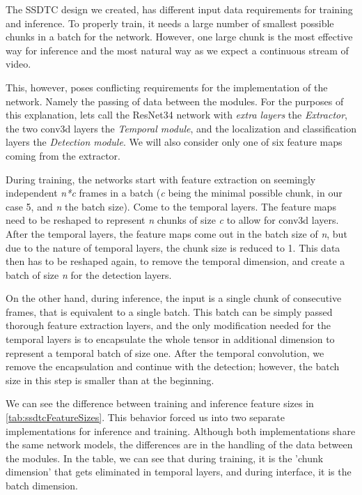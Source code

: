 
The SSDTC design we created, has different input data requirements for training and inference. To properly train, it needs a large number of smallest possible chunks in a batch for the network. However, one large chunk is the most effective way for inference and the most natural way as we expect a continuous stream of video.

This, however, poses conflicting requirements for the implementation of the network. Namely the passing of data between the modules. For the purposes of this explanation, lets call the ResNet34 network with \textit{extra layers} the \textit{Extractor}, the two conv3d layers the \textit{Temporal module}, and the localization and classification layers the \textit{Detection module}. We will also consider only one of six feature maps coming from the extractor. 

During training, the networks start with feature extraction on seemingly independent \textit{n*c} frames in a batch (\textit{c} being the minimal possible chunk, in our case 5, and \textit{n} the batch size). Come to the temporal layers. The feature maps need to be reshaped to represent \textit{n} chunks of size \textit{c} to allow for conv3d layers. After the temporal layers, the feature maps come out in the batch size of \textit{n}, but due to the nature of temporal layers, the chunk size is reduced to 1. This data then has to be reshaped again, to remove the temporal dimension, and create a batch of size \textit{n} for the detection layers.  

On the other hand, during inference, the input is a single chunk of consecutive frames, that is equivalent to a single batch. This batch can be simply passed thorough feature extraction layers, and the only modification needed for the temporal layers is to encapsulate the whole tensor in additional dimension to represent a temporal batch of size one. After the temporal convolution, we remove the encapsulation and continue with the detection; however, the batch size in this step is smaller than at the beginning. 

We can see the difference between training and inference feature sizes in \cref{tab:ssdtcFeatureSizes}. This behavior forced us into two separate implementations for inference and training. Although both implementations share the same network models, the differences are in the handling of the data between the modules. In the table, we can see that during training, it is the 'chunk dimension' that gets eliminated in temporal layers, and during interface, it is the batch dimension. 


